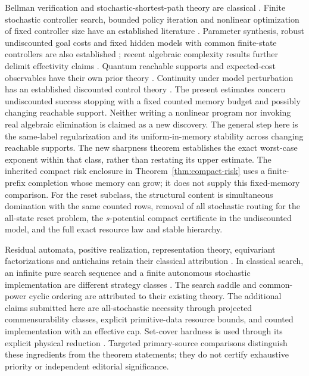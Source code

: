 Bellman verification and stochastic-shortest-path theory are classical
\cite{BertsekasTsitsiklis91}.  Finite stochastic controller search,
bounded policy iteration and nonlinear optimization of fixed controller
size have an established literature
\cite{Meuleau99,PoupartBoutilier03,AmatoBernsteinZilberstein10}.
Parameter synthesis, robust undiscounted goal costs and fixed hidden
models with common finite-state controllers are also established
\cite{JungesEtAl18,CubuktepeEtAl21,GaleslootEtAl25}; recent algebraic
complexity results further delimit effectivity claims
\cite{BovyEtAl26}.  Quantum reachable supports and expected-cost
observables have their own prior theory
\cite{YuYing12,YingFengYuYing13,LiuZhouBartheYing25,AvanziniEtAl22}.
Continuity under model perturbation has an established discounted
control theory \cite{KaraYuksel2020}.  The present estimates concern
undiscounted success stopping with a fixed counted memory budget and
possibly changing reachable support.
Neither writing a nonlinear program nor invoking real algebraic
elimination is claimed as a new discovery.  The general step here is the same-label regularization and its
uniform-in-memory stability across changing reachable supports.
The new sharpness theorem establishes the exact worst-case exponent
within that class, rather than restating its upper estimate.  The inherited compact
risk enclosure in Theorem~\ref{thm:compact-risk} uses a finite-prefix
completion whose memory can grow; it does not supply this fixed-memory
comparison.  For the reset subclass, the structural content is simultaneous domination with the same counted rows,
removal of all stochastic routing for the all-state reset problem,
the $s$-potential compact certificate in the undiscounted model,
and the full exact resource law and stable hierarchy.

Residual automata, positive realization, representation theory,
equivariant factorizations and antichains retain their classical
attribution \cite{RabinScott59,Rabin63,Heller65,CarlylePaz71,
BenvenutiFarina04,Schwarz64,Flor69,Serre77,GPT13,VandaeleGillisGlineur17}.
In classical search, an infinite pure search sequence and a finite
autonomous stochastic implementation are different strategy classes
\cite{BuiLidbetterLin2023}.  The search saddle and common-power cyclic
ordering are attributed to their existing theory.  The additional
claims submitted here are all-stochastic necessity through projected
commensurability classes, explicit primitive-data resource bounds,
and counted implementation with an effective cap.
Set-cover hardness is used through its explicit physical reduction
\cite{Karp72}.  Targeted primary-source comparisons distinguish these
ingredients from the theorem statements; they do not certify
exhaustive priority or independent editorial significance.


